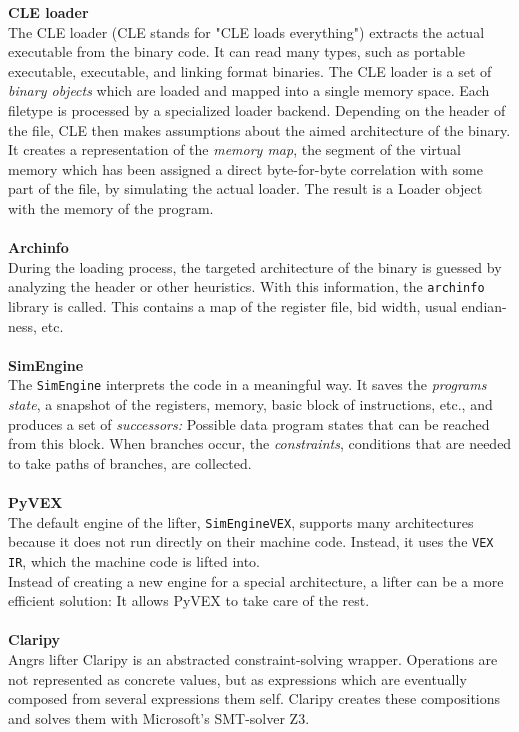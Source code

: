 \documentclass[seminar]{plai}
\begin{document}
\noindent\textbf{CLE loader}\\
The CLE loader (CLE stands for "CLE loads everything") extracts the actual executable from the binary code. It can read many types, such as portable executable, executable, and linking format binaries. The CLE loader is a set of \textit{binary objects} which are loaded and mapped into a single memory space. Each filetype is processed by a specialized loader backend.\cite{loading-a-binary}
Depending on the header of the file, CLE then makes assumptions about the aimed architecture of the binary. It creates a representation of the \textit{memory map}, the segment of the virtual memory which has been assigned a direct byte-for-byte correlation with some part of the file, by simulating the actual loader. The result is a Loader object with the memory of the program.
\\\\
\textbf{Archinfo}\\
During the loading process, the targeted architecture of the binary is guessed by analyzing the header or other heuristics. With this information, the \texttt{archinfo} library is called. This contains a map of the register file, bid width, usual endian-ness, etc.
\\\\
\textbf{SimEngine}\\
The \texttt{SimEngine} interprets the code in a meaningful way. It saves the \textit{programs state}, a snapshot of the registers, memory, basic block of instructions, etc., and produces a set of \textit{successors:} Possible data program states that can be reached from this block.
When branches occur, the \textit{constraints}, conditions that are needed to take paths of branches, are collected.
\\\\
\textbf{PyVEX}\\
The default engine of the lifter, \texttt{SimEngineVEX}, supports many architectures because it does not run directly on their machine code. Instead, it uses the \texttt{VEX IR}, which the machine code is lifted into.\cite{angr-internals}\\
Instead of creating a new engine for a special architecture, a lifter can be a more efficient solution: It allows PyVEX to take care of the rest.\cite{art-of-war-angr}
\\\\
\textbf{Claripy}\\
Angrs lifter Claripy is an abstracted constraint-solving wrapper\cite{claripy-documentation}. Operations are not represented as concrete values, but as expressions which are eventually composed from several expressions them self. Claripy creates these compositions and solves them with Microsoft's SMT-solver Z3.\cite{angr-internals}
\end{document}
